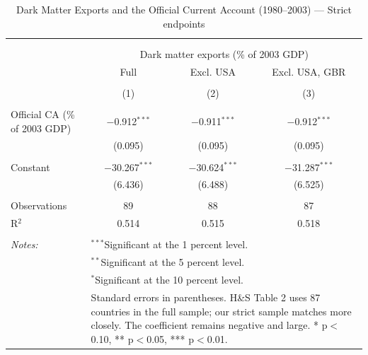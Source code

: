 \documentclass[11pt]{article}
\begin{document}
\small
\setcounter{table}{1}

\begin{table}[!htbp] \centering 
  \caption{Dark Matter Exports and the Official Current Account (1980--2003) --- Strict endpoints} 
  \label{tab:table2_corrected} 
\begin{tabular}{@{\extracolsep{5pt}}lccc} 
\\[-1.8ex]\hline 
\hline \\[-1.8ex] 
\\[-1.8ex] & \multicolumn{3}{c}{Dark matter exports (\% of 2003 GDP)} \\ 
 & Full & Excl. USA & Excl. USA, GBR \\ 
\\[-1.8ex] & (1) & (2) & (3)\\ 
\hline \\[-1.8ex] 
 Official CA (\% of 2003 GDP) & $-$0.912$^{***}$ & $-$0.911$^{***}$ & $-$0.912$^{***}$ \\ 
  & (0.095) & (0.095) & (0.095) \\ 
  & & & \\ 
 Constant & $-$30.267$^{***}$ & $-$30.624$^{***}$ & $-$31.287$^{***}$ \\ 
  & (6.436) & (6.488) & (6.525) \\ 
  & & & \\ 
Observations & 89 & 88 & 87 \\ 
R$^{2}$ & 0.514 & 0.515 & 0.518 \\ 
\hline \\[-1.8ex] 
\textit{Notes:} & \multicolumn{3}{l}{$^{***}$Significant at the 1 percent level.} \\ 
 & \multicolumn{3}{l}{$^{**}$Significant at the 5 percent level.} \\ 
 & \multicolumn{3}{l}{$^{*}$Significant at the 10 percent level.} \\ 
 & \multicolumn{3}{l}{Standard errors in parentheses. H\&S Table 2 uses 87 countries in the full sample; our strict sample matches more closely. The coefficient remains negative and large. * p$<$0.10, ** p$<$0.05, *** p$<$0.01.} \\ 
\end{tabular} 
\end{table} 
\end{document}
